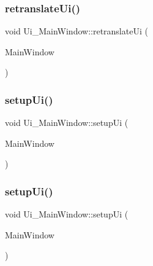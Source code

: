 \mbox{\label{class_ui___main_window_a097dd160c3534a204904cb374412c618}} 
\subsubsection{\texorpdfstring{retranslateUi()}{retranslateUi()}\hspace{0.1cm}{\footnotesize\ttfamily [2/2]}}
{\footnotesize\ttfamily void Ui\+\_\+\+Main\+Window\+::retranslate\+Ui (\begin{DoxyParamCaption}\item[{Q\+Main\+Window $\ast$}]{Main\+Window }\end{DoxyParamCaption})\hspace{0.3cm}{\ttfamily [inline]}}

\mbox{\label{class_ui___main_window_acf4a0872c4c77d8f43a2ec66ed849b58}} 
\subsubsection{\texorpdfstring{setupUi()}{setupUi()}\hspace{0.1cm}{\footnotesize\ttfamily [1/2]}}
{\footnotesize\ttfamily void Ui\+\_\+\+Main\+Window\+::setup\+Ui (\begin{DoxyParamCaption}\item[{Q\+Main\+Window $\ast$}]{Main\+Window }\end{DoxyParamCaption})\hspace{0.3cm}{\ttfamily [inline]}}

\mbox{\label{class_ui___main_window_acf4a0872c4c77d8f43a2ec66ed849b58}} 
\subsubsection{\texorpdfstring{setupUi()}{setupUi()}\hspace{0.1cm}{\footnotesize\ttfamily [2/2]}}
{\footnotesize\ttfamily void Ui\+\_\+\+Main\+Window\+::setup\+Ui (\begin{DoxyParamCaption}\item[{Q\+Main\+Window $\ast$}]{Main\+Window }\end{DoxyParamCaption})\hspace{0.3cm}{\ttfamily [inline]}}



